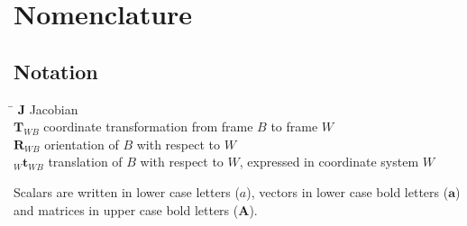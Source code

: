
\chapter*{Nomenclature}\label{chap:symbole}

\section*{Notation}
  \begin{tabbing}
    \hspace*{1.6cm}   \= \kill
    $\mathbf{J}$       \> Jacobian \\[0.5ex]
    $\mathbf{T}_{WB}$  \> coordinate transformation from frame $B$ to frame $W$ \\[0.5ex]
    $\mathbf{R}_{WB}$  \> orientation of $B$ with respect to $W$ \\[0.5ex]
    $_W\mathbf{t}_{WB}$\> translation of $B$ with respect to $W$, expressed in coordinate system $W$ \\[0.5ex]
  \end{tabbing}
  
Scalars are written in lower case letters ($a$), vectors in lower case bold letters ($\mathbf{a}$) and matrices in upper case bold letters ($\mathbf{A}$).

